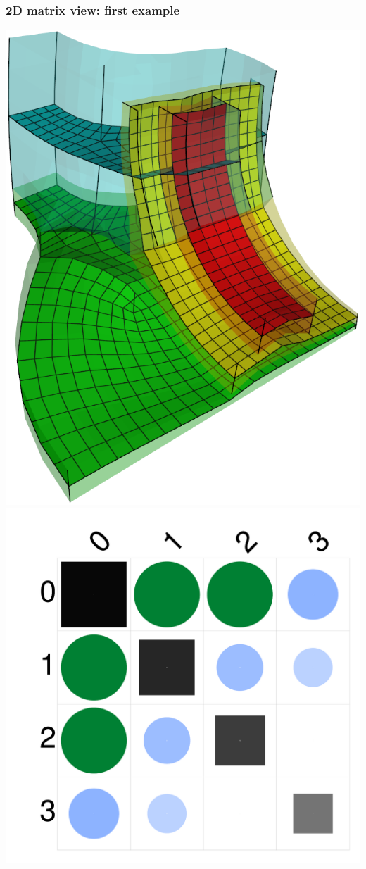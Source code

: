 \documentclass[12pt]{beamer}
\begin{document}

\begin{frame}[fragile]
  \frametitle{2D matrix view: first example}
  \begin{center}
  \includegraphics[height=0.9\textheight]{./images/vis-2d-ex1-sheets.png}
  \includegraphics[height=0.5\textheight]{./images/vis-2d-ex1-matrix.png}

\end{center}
\end{frame}
\end{document}
